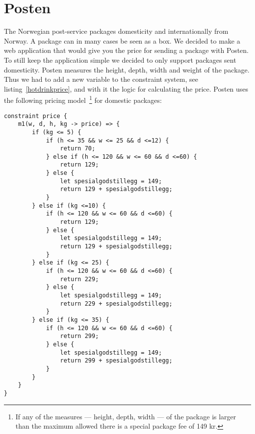 \section{Posten}
The Norwegian post-service packages domesticity and internationally from Norway. 
A package can in many cases be seen as a box. We decided to make a web application 
that would give you the price for sending a package with Posten. To still keep the 
application simple we decided to only support packages sent domesticity. Posten 
measures the height, depth, width and weight of the package. Thus we had to add a new 
variable to the constraint system, see listing~\ref{hotdrinkprice}, and with it the logic for calculating the price. 
Posten uses the following pricing 
model~\cite{postenNorgespakken}\footnote{If any of the measures --- height, depth, width --- of the package is larger than the maximum allowed there is a special package fee of 149 kr.} 
for domestic packages:

\begin{lstlisting}[caption={HotDrink logic for determining the price},label=hotdrinkprice, language=hotdrink]
constraint price {
    m1(w, d, h, kg -> price) => {
        if (kg <= 5) {
            if (h <= 35 && w <= 25 && d <=12) {
                return 70;
            } else if (h <= 120 && w <= 60 && d <=60) {
                return 129;
            } else {
                let spesialgodstillegg = 149;
                return 129 + spesialgodstillegg;
            }
        } else if (kg <=10) {
            if (h <= 120 && w <= 60 && d <=60) {
                return 129;
            } else {
                let spesialgodstillegg = 149;
                return 129 + spesialgodstillegg;
            }
        } else if (kg <= 25) {
            if (h <= 120 && w <= 60 && d <=60) {
                return 229;
            } else {
                let spesialgodstillegg = 149;
                return 229 + spesialgodstillegg;
            }
        } else if (kg <= 35) {
            if (h <= 120 && w <= 60 && d <=60) {
                return 299;
            } else {
                let spesialgodstillegg = 149;
                return 299 + spesialgodstillegg;
            }
        }
    }
}
\end{lstlisting}

